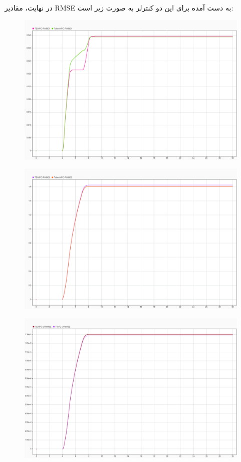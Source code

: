 در نهایت، مقادیر RMSE به دست آمده برای این دو کنترلر به صورت زیر است:
\begin{figure}[H]
	\centering
	\includegraphics[width=0.7\linewidth]{../img/43}
	\caption{}
	\label{fig:43}
\end{figure}
\begin{figure}[H]
	\centering
	\includegraphics[width=0.7\linewidth]{../img/44}
	\caption{}
	\label{fig:44}
\end{figure}
\begin{figure}[H]
	\centering
	\includegraphics[width=0.7\linewidth]{../img/45}
	\caption{}
	\label{fig:45}
\end{figure}
